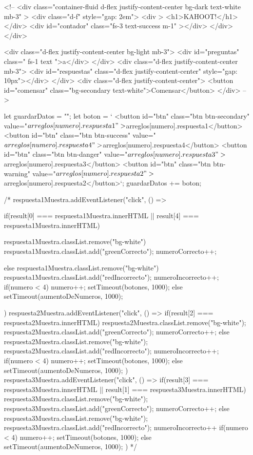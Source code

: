 
<!-- <div class="container-fluid d-flex justify-content-center bg-dark text-white mb-3" >
    <div class="d-f" style="gap: 2em">
        <div >
            <h1>KAHOOT!</h1>
        </div>
        <div id="contador" class="fs-3 text-success m-1" ></div>
    </div> 
</div>
    
    <div class="d-flex justify-content-center bg-light mb-3">
        <div id="preguntas" class=" fs-1 text ">a</div>
    </div>
    <div class="d-flex justify-content-center mb-3">
        <div id="respuestas" class="d-flex justify-content-center" style="gap: 10px"></div>
    </div>
    <div class="d-flex justify-content-center">
        <button id="comensar" class="bg-secondary text-white">Comensar</button>
    </div> -->




let guardarDatos = "";
    let boton = `
    <button id="btn" class="btn btn-secondary" value="${arreglos[numero].respuesta1}">${arreglos[numero].respuesta1}</button>
    <button id="btn" class="btn btn-success" value="${arreglos[numero].respuesta4}">${arreglos[numero].respuesta4}</button>
    <button id="btn" class="btn btn-danger" value="${arreglos[numero].respuesta3}">${arreglos[numero].respuesta3}</button>
    <button id="btn" class="btn btn-warning" value="${arreglos[numero].respuesta2}">${arreglos[numero].respuesta2}</button>`;
    guardarDatos += boton;








/*
respuesta1Muestra.addEventListener("click", () => {
    if(result[0] === respuesta1Muestra.innerHTML || result[4] === respuesta1Muestra.innerHTML){
        respuesta1Muestra.classList.remove("bg-white") 
        respuesta1Muestra.classList.add("greenCorrecto");
        numeroCorrecto++;

    }else{
        respuesta1Muestra.classList.remove("bg-white") 
        respuesta1Muestra.classList.add("redIncorrecto");
                    numeroIncorrecto++;
    }
    if(numero < 4){
        numero++;
        setTimeout(botones, 1000);
    }else {
            setTimeout(aumentoDeNumeros, 1000);
    }
})
respuesta2Muestra.addEventListener("click", () => {
    if(result[2] === respuesta2Muestra.innerHTML){
        respuesta2Muestra.classList.remove("bg-white");
        respuesta2Muestra.classList.add("greenCorrecto");
        numeroCorrecto++;
    }else{
        respuesta2Muestra.classList.remove("bg-white");
        respuesta2Muestra.classList.add("redIncorrecto");
        numeroIncorrecto++;
    }
    if(numero < 4){
        numero++;
        setTimeout(botones, 1000);
    }else {
        setTimeout(aumentoDeNumeros, 1000);
    }
})
respuesta3Muestra.addEventListener("click", () => {
    if(result[3] === respuesta3Muestra.innerHTML || result[1] === respuesta3Muestra.innerHTML){
       respuesta3Muestra.classList.remove("bg-white");
       respuesta3Muestra.classList.add("greenCorrecto");
        numeroCorrecto++;
    }else{
        respuesta3Muestra.classList.remove("bg-white");
        respuesta3Muestra.classList.add("redIncorrecto");
        numeroIncorrecto++
    }
    if(numero < 4){
        numero++;
        setTimeout(botones, 1000);
    }else {
        setTimeout(aumentoDeNumeros, 1000);
    }
}) */
